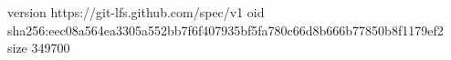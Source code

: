 version https://git-lfs.github.com/spec/v1
oid sha256:eec08a564ea3305a552bb7f6f407935bf5fa780c66d8b666b77850b8f1179ef2
size 349700
